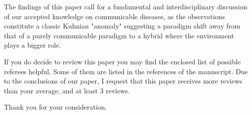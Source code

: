 \documentclass[11pt,a4paper,roman]{moderncv}
\begin{document}
The findings of this paper call for a fundamental and interdisciplinary discussion of our accepted knowledge on communicable diseases, as the observations constitute a classic Kuhnian "anomaly" suggesting a paradigm shift away from that of a purely communicable paradigm to a hybrid where the environment plays a bigger role.

If you do decide to review this paper you may find the enclosed list of possible referees helpful. Some of them are listed in the references of the manuscript. Due to the conclusions of our paper, I request that this paper receives more reviews than your average, and at least 3 reviews.

Thank you for your consideration.

\makeletterclosing
\newpage


\end{document}
